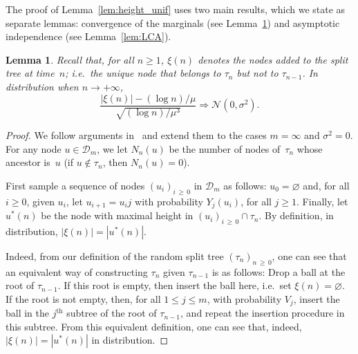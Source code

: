 \documentclass[10pt]{amsart}
\newtheorem{lemm}[theo]{Lemma}\newtheorem{prop}[theo]{Proposition}\newtheorem{coro}[theo]{Corollary}\newtheorem{conj}[theo]{Conjecture}
\theoremstyle{definition}\newtheorem{defi}[theo]{Definition}\newtheorem{rema}[theo]{Remark}\newtheorem{exam}[theo]{Example}\newtheorem{exem}[theo]{Example}\newtheorem{nota}[theo]{Notation}
\newcommand{\clD}{\mathcal{D}}
\newcommand{\clN}{\mathcal{N}}
\begin{document}
The proof of Lemma~\ref{lem:height_unif} uses two main results, which we state as separate lemmas: convergence of the marginals (see Lemma~\ref{lem:marg}) and asymptotic independence (see Lemma~\ref{lem:LCA}).

\begin{lemm}\label{lem:marg}
Recall that, for all $n\geq 1$, $\xi(n)$ denotes the nodes added to the split tree at time~$n$; i.e.\ the unique node that belongs to $\tau_n$ but not to $\tau_{n-1}$. In distribution when $n\to+\infty$,
\[
\frac{|\xi(n)|-(\log n)/\mu}{\sqrt{(\log n)/\mu^3}}\Rightarrow\clN(0,\sigma^2).
\]
\end{lemm}

\begin{proof}
{We follow arguments in~\cite[Theorem~2]{devroye-split} and extend them to the cases $m=\infty$ and $\sigma^2=0$.} For any node $u\in \clD_m$, we let $N_n(u)$ be the number of nodes of~$\tau_n$ whose ancestor is~$u$ (if $u\notin\tau_n$, then $N_n(u) = 0$).

First sample a sequence of nodes $(u_i)_{i\,\geq\,0}$ in $\clD_m$ as follows: $u_0 = \varnothing$ and, for all $i\geq 0$, given $u_i$, let $u_{i+1} = u_i j$ with probability $Y_j(u_i)$, for all $j\geq 1$. Finally, let $u^*(n)$ be the node with maximal height in $(u_i)_{i\,\geq\,0} \cap \tau_n$. By definition, in distribution, $|\xi(n)| = |u^*(n)|$.

Indeed, from our definition of the random split tree $(\tau_n)_{n\,\geq \,0}$, one can see that an equivalent way of constructing $\tau_n$ given $\tau_{n-1}$ is as follows: Drop a ball at the root of $\tau_{n-1}$. If this root is empty, then insert the ball here, i.e.\ set $\xi(n) = \varnothing$. If the root is not empty, then, for all $1\leq j\leq m$, with probability $V_j$, insert the ball in the $j^{\text{th}}$ subtree of the root of $\tau_{n-1}$, and repeat the insertion procedure in this subtree. From this equivalent definition, one can see that, indeed, $|\xi(n)| = |u^*(n)|$ in distribution.


\end{proof}
\end{document}
